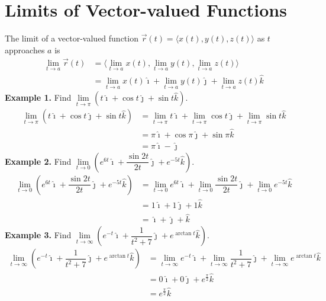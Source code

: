 \chapter{Limits of Vector-valued Functions}

The limit of a vector-valued function $\vec{r}(t) = \langle x(t), y(t), z(t)
    \rangle$ as $t$ approaches $a$ is
\begin{align*}
    \lim_{t \to a} \vec{r}(t) & = \langle\lim_{t \to a} x(t), \lim_{t \to a} y(t), \lim_{t \to a} z(t) \rangle                   \\
                              & = \lim_{t \to a} x(t)\hat{\imath} + \lim_{t \to a} y(t)\hat{\jmath} + \lim_{t \to a} z(t)\hat{k}
\end{align*}
\noindent\textbf{Example 1. } Find $\lim\limits_{t \to \pi}(t\hat{\imath} + \cos t\hat{\jmath} + \sin t\hat{k})$.
\begin{align*}
    \lim_{t \to \pi} (t\hat{\imath} + \cos t\hat{\jmath} + \sin t\hat{k}) & = \lim_{t \to \pi} t\hat{\imath} + \lim_{t \to \pi} \cos t\hat{\jmath} + \lim_{t \to \pi} \sin t\hat{k} \\
                                                                          & = \pi\hat{\imath} + \cos \pi\hat{\jmath} + \sin \pi\hat{k}                                              \\
                                                                          & = \pi\hat{\imath} - \hat{\jmath}
\end{align*}
\noindent\textbf{Example 2. } Find $\lim\limits_{t \to 0}(e^{6t}\hat{\imath} + \dfrac{\sin{2t}}{2t}\hat{\jmath} + e^{-5t}\hat{k})$.
\begin{align*}
    \lim_{t \to 0} (e^{6t}\hat{\imath} + \dfrac{\sin{2t}}{2t}\hat{\jmath} + e^{-5t}\hat{k}) & = \lim_{t \to 0} e^{6t}\hat{\imath} + \lim_{t \to 0} \dfrac{\sin{2t}}{2t}\hat{\jmath} + \lim_{t \to 0} e^{-5t}\hat{k} \\
                                                                                            & = 1\hat{\imath} + 1\hat{\jmath} + 1\hat{k}                                                                            \\
                                                                                            & = \hat{\imath} + \hat{\jmath} + \hat{k}
\end{align*}
\noindent\textbf{Example 3. } Find $\lim\limits_{t \to \infty}(e^{-t}\hat{\imath} + \dfrac{1}{t^2 + 7}\hat{\jmath} + e^{\arctan{t}}\hat{k})$.
\begin{align*}
    \lim_{t \to \infty} (e^{-t}\hat{\imath} + \dfrac{1}{t^2 + 7}\hat{\jmath} + e^{\arctan{t}}\hat{k}) & = \lim_{t \to \infty} e^{-t}\hat{\imath} + \lim_{t \to \infty} \dfrac{1}{t^2 + 7}\hat{\jmath} + \lim_{t \to \infty} e^{\arctan{t}}\hat{k} \\
                                                                                                      & = 0\hat{\imath} + 0\hat{\jmath} + e^{\frac{\pi}{2}}\hat{k}                                                                                \\
                                                                                                      & = e^{\frac{\pi}{2}}\hat{k}
\end{align*}
